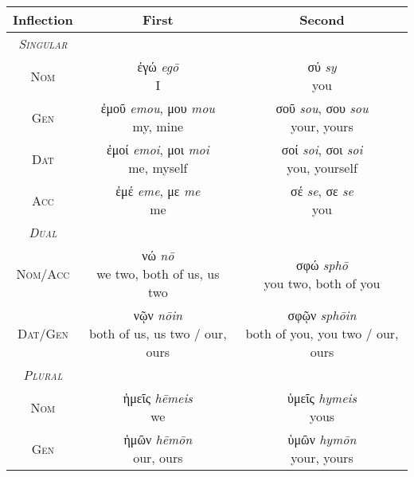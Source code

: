 \documentclass[10pt]{memoir}
\newcommand{\tsc}[1]{\textsc{#1}}
\newcommand{\grc}[1]{\fontspec{Inter}#1}
\newcommand{\trc}[1]{\textit{\fontspec{Tinos}#1}}
\begin{document}
    \begin{table}[H]
        \begin{tabular}{c|cc}
            \textbf{Inflection} & \textbf{First} & \textbf{Second} \\
            \hline
            \emph{\tsc{Singular}} \\
            \tsc{Nom} & \makecell{\grc{ἐγώ} \trc{egō} \\ \small I} & \makecell{\grc{σύ} \trc{sy} \\ \small you} \\
            \tsc{Gen} & \makecell{\grc{ἐμοῦ} \trc{emou}, \grc{μου} \trc{mou} \\ \small my, mine} & \makecell{\grc{σοῦ} \trc{sou}, \grc{σου} \trc{sou} \\ \small your, yours} \\
            \tsc{Dat} & \makecell{\grc{ἐμοί} \trc{emoi}, \grc{μοι} \trc{moi} \\ \small me, myself} & \makecell{\grc{σοί} \trc{soi}, \grc{σοι} \trc{soi} \\ \small you, yourself} \\
            \tsc{Acc} & \makecell{\grc{ἐμέ} \trc{eme}, \grc{με} \trc{me} \\ \small me} & \makecell{\grc{σέ} \trc{se}, \grc{σε} \trc{se} \\ \small you} \\
            \hline
            \emph{\tsc{Dual}} \\
            \tsc{Nom/Acc} & \makecell{\grc{νώ} \trc{nō} \\ \small we two, both of us, us two} & \makecell{ \grc{σφώ} \trc{sphō} \\ \small you two, both of you} \\
            \tsc{Dat/Gen} & \makecell{\grc{νῷν} \trc{nōin} \\ \small both of us, us two / our, ours } & \makecell{\grc{σφῷν} \trc{sphōin} \\ \small both of you, you two / our, ours } \\
            \hline
            \emph{\tsc{Plural}} \\
            \tsc{Nom} & \makecell{\grc{ἡμεῖς} \trc{hēmeis} \\ \small we} & \makecell{\grc{ὑμεῖς} \trc{hymeis} \\ \small yous} \\
            \tsc{Gen} & \makecell{\grc{ἡμῶν} \trc{hēmōn} \\ \small our, ours} & \makecell{\grc{ὑμῶν} \trc{hymōn} \\ \small your, yours} \\

\end{tabular}
\end{table}
\end{document}
